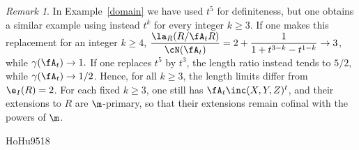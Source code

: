 \documentclass[12pt]{amsart}
\theoremstyle{plain}
\theoremstyle{remark}
\newtheorem{remark}[theorem]{Remark}
\theoremstyle{definition}
\numberwithin{equation}{theorem}
\renewcommand{\geq}{\geqslant} \renewcommand{\leq}{\leqslant}
\begin{document}
\begin{remark} In Example~\ref{domain} we have used $t^5$ for definiteness, but one
obtains a similar example using instead $t^k$ for every integer $k \geq 3$.   
If one makes this replacement for an integer $k\geq4$,
$\displaystyle
\frac{\la_R(R/\fA_tR)}{\cN(\fA_t)}
=2+\frac{1}{1+t^{3-k}-t^{1-k}} \to 3$, while $\gamma(\fA_t) \to 1.$
If one replaces $t^5$ by $t^3$, the length ratio instead tends to $5/2$, while
$\gamma(\fA_t) \to 1/2$.
Hence, for all $k \geq 3$, the length limits differ from $\e_I(R)=2$.
For each fixed $k\geq 3$, one still has $\fA_t \inc (X,Y,Z)^t$, and their extensions
to $R$ are $\m$-primary, so that their extensions remain cofinal
with the powers of $\m$.
\end{remark}

\begin{thebibliography}{HoHu9518}



\end{thebibliography}
\end{document}

